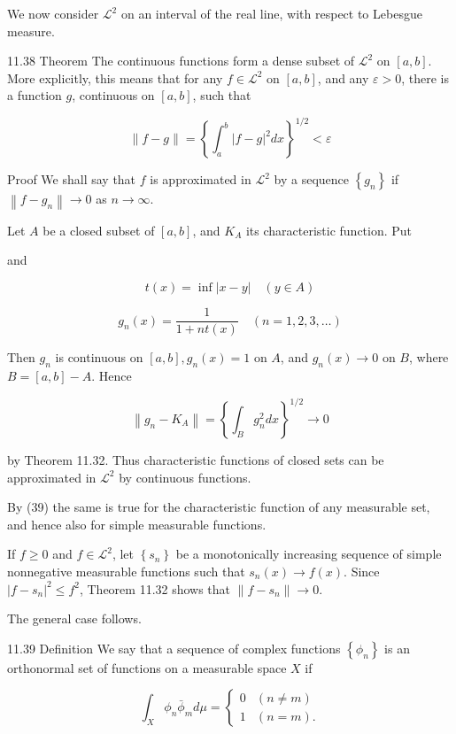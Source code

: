 \documentclass[10pt]{article}
\begin{document}
We now consider $\mathscr{L}^{2}$ on an interval of the real line, with respect to Lebesgue measure.

11.38 Theorem The continuous functions form a dense subset of $\mathscr{L}^{2}$ on $[a, b]$. More explicitly, this means that for any $f \in \mathscr{L}^{2}$ on $[a, b]$, and any $\varepsilon>0$, there is a function $g$, continuous on $[a, b]$, such that

$$
\|f-g\|=\left\{\int_{a}^{b}|f-g|^{2} d x\right\}^{1 / 2}<\varepsilon
$$

Proof We shall say that $f$ is approximated in $\mathscr{L}^{2}$ by a sequence $\left\{g_{n}\right\}$ if $\left\|f-g_{n}\right\| \rightarrow 0$ as $n \rightarrow \infty$.

Let $A$ be a closed subset of $[a, b]$, and $K_{A}$ its characteristic function. Put

and

$$
t(x)=\inf |x-y| \quad(y \in A)
$$

$$
g_{n}(x)=\frac{1}{1+n t(x)} \quad(n=1,2,3, \ldots)
$$

Then $g_{n}$ is continuous on $[a, b], g_{n}(x)=1$ on $A$, and $g_{n}(x) \rightarrow 0$ on $B$, where $B=[a, b]-A$. Hence

$$
\left\|g_{n}-K_{A}\right\|=\left\{\int_{B} g_{n}^{2} d x\right\}^{1 / 2} \rightarrow 0
$$

by Theorem 11.32. Thus characteristic functions of closed sets can be approximated in $\mathscr{L}^{2}$ by continuous functions.

By (39) the same is true for the characteristic function of any measurable set, and hence also for simple measurable functions.

If $f \geq 0$ and $f \in \mathscr{L}^{2}$, let $\left\{s_{n}\right\}$ be a monotonically increasing sequence of simple nonnegative measurable functions such that $s_{n}(x) \rightarrow f(x)$. Since $\left|f-s_{n}\right|^{2} \leq f^{2}$, Theorem 11.32 shows that $\left\|f-s_{n}\right\| \rightarrow 0$.

The general case follows.

11.39 Definition We say that a sequence of complex functions $\left\{\phi_{n}\right\}$ is an orthonormal set of functions on a measurable space $X$ if

$$
\int_{X} \phi_{n} \bar{\phi}_{m} d \mu= \begin{cases}0 & (n \neq m) \\ 1 & (n=m) .\end{cases}
$$
\end{document}
